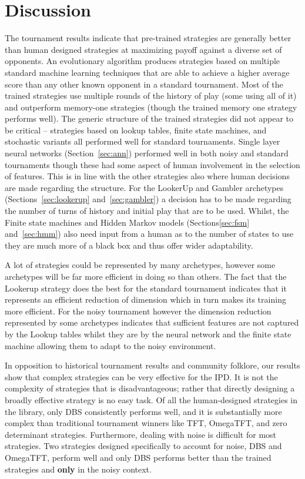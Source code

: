 \documentclass{article}
\begin{document}
\section{Discussion}

The tournament results indicate that pre-trained strategies are generally better
than human designed strategies at maximizing payoff against a diverse set of
opponents. An evolutionary algorithm produces strategies based on multiple
standard machine learning techniques that are able to achieve a higher average
score than any other known opponent in a standard tournament. Most of the trained
strategies use multiple rounds of the history of play (some using all of it) and
outperform memory-one strategies (though the trained memory one strategy performs
well). The generic structure of the trained strategies did not appear to be
critical -- strategies based on lookup tables, finite state machines, and stochastic
variants all performed well for standard tournaments.
Single layer neural networks (Section~\ref{sec:ann}) performed well in both
noisy and standard
tournaments
though these had some aspect of human involvement in the selection of features.
This is in line with the other strategies also where human decisions are made
regarding the structure. For the LookerUp and Gambler archetypes
(Sections~\ref{sec:lookerup} and~\ref{sec:gambler})
a decision has to be made
regarding the number of turns of history and initial play that are to be used.
Whilst, the Finite state machines and Hidden Markov models
(Sections\ref{sec:fsm} and~\ref{sec:hmm}) also need input from a
human as to the number of states to use they are much more of a black box and
thus offer wider adaptability.

A lot of strategies could be represented by many archetypes, however some
archetypes will be far more efficient in doing so than
others. The fact that the Lookerup strategy does the best for the standard
tournament indicates that it represents an efficient reduction of
dimension which in turn makes its training more efficient. For the noisy
tournament however the dimension reduction represented by some archetypes
indicates that sufficient features are not captured by the Lookup tables whilst
they are by the
neural network and the finite state machine allowing them to adapt to the noisy
environment.

In opposition to historical tournament results and community folklore,
our results show that complex strategies can be very effective for the
IPD\@. It is not the complexity of strategies that is disadvantageous; rather that directly
designing a broadly effective strategy is no easy task. Of all the human-designed
strategies in the library, only DBS consistently performs well, and it is
substantially more complex than traditional tournament winners like TFT, OmegaTFT,
and zero determinant strategies. Furthermore, dealing with noise is difficult
for most strategies. Two strategies designed specifically to account for noise,
DBS and OmegaTFT, perform well and only DBS performs better than the trained
strategies and \textbf{only} in the noisy context.
\end{document}
